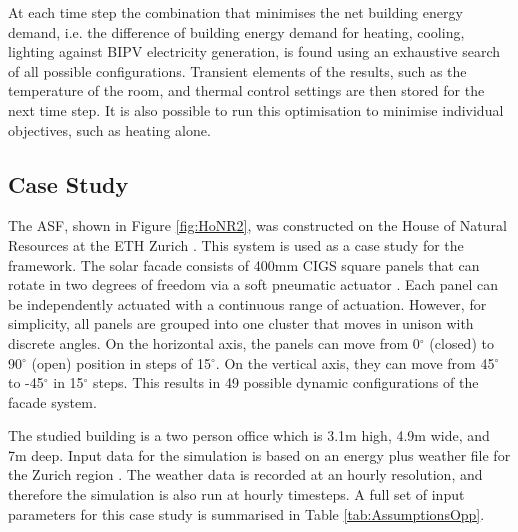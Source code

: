 At each time step the combination that minimises the net building energy demand, i.e. the difference of building energy demand for heating, cooling, lighting against BIPV electricity generation, is found using an exhaustive search of all possible configurations. Transient elements of the results, such as the temperature of the room, and thermal control settings are then stored for the next time step. It is also possible to run this optimisation to minimise individual objectives, such as heating alone.



\subsection{Case Study}

The ASF, shown in Figure \ref{fig:HoNR2}, was constructed on the House of Natural Resources at the ETH Zurich \cite{nagy2016adaptive}. This system is used as a case study for the framework. The solar facade consists of 400mm CIGS square panels that can rotate in two degrees of freedom via a soft pneumatic actuator \cite{svetozarevic2016soro}. Each panel can be independently actuated with a continuous range of actuation. However, for simplicity, all panels are grouped into one cluster that moves in unison with discrete angles. On the horizontal axis, the panels can move from 0$^{\circ}$ (closed) to 90$^{\circ}$ (open) position in steps of 15$^{\circ}$. On the vertical axis, they can move from 45$^{\circ}$ to -45$^{\circ}$ in 15$^{\circ}$ steps. This results in 49 possible dynamic configurations of the facade system.

The studied building is a two person office which is 3.1m high, 4.9m wide, and 7m deep. Input data for the simulation is based on an energy plus weather file for the Zurich region \cite{remund1997meteonorm}. The weather data is recorded at an hourly resolution, and therefore the simulation is also run at hourly timesteps. A full set of input parameters for this case study is summarised in Table \ref{tab:AssumptionsOpp}.



